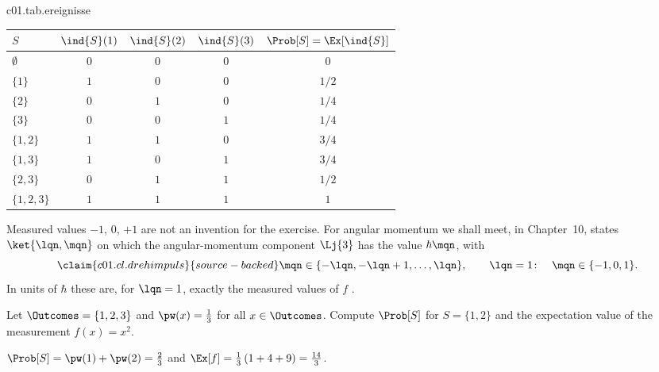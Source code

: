 \begin{tpctable}{c01.tab.ereignisse}
  \caption{All eight events of the experiment of Example~\ref{c01.ex.drei-ergebnisse}, with
    the values of their indicator function at the points $1$, $2$, $3$ and their probability
    for $\pw = (\tfrac12, \tfrac14, \tfrac14)$. Every row is a yes-no measurement and its
    expectation value.}
  \begin{tabular}{lcccc}
    \toprule
    $S$ & $\ind{S}(1)$ & $\ind{S}(2)$ & $\ind{S}(3)$ & $\Prob[S] = \Ex[\ind{S}]$ \\
    \midrule
    $\emptyset$ & $0$ & $0$ & $0$ & $0$ \\
    $\{1\}$ & $1$ & $0$ & $0$ & $1/2$ \\
    $\{2\}$ & $0$ & $1$ & $0$ & $1/4$ \\
    $\{3\}$ & $0$ & $0$ & $1$ & $1/4$ \\
    $\{1, 2\}$ & $1$ & $1$ & $0$ & $3/4$ \\
    $\{1, 3\}$ & $1$ & $0$ & $1$ & $3/4$ \\
    $\{2, 3\}$ & $0$ & $1$ & $1$ & $1/2$ \\
    $\{1, 2, 3\}$ & $1$ & $1$ & $1$ & $1$ \\
    \bottomrule
  \end{tabular}
\end{tpctable}

Measured values $-1$, $0$, $+1$ are not an invention for the exercise. For angular momentum
we shall meet, in Chapter~10, states $\ket{\lqn, \mqn}$ on which the angular-momentum
component $\Lj{3}$ has the value $\hbar \mqn$, with
\begin{equation}\label{c01.eq.drehimpuls}\claim{c01.cl.drehimpuls}{source-backed}
  \mqn \in \{-\lqn, -\lqn + 1, \dots, \lqn\},
  \qquad
  \lqn = 1\colon \quad \mqn \in \{-1, 0, 1\} .
\end{equation}
In units of $\hbar$ these are, for $\lqn = 1$, exactly the measured values of $f$
.

\begin{exercise}\label{c01.exc.drei}
  Let $\Outcomes = \{1, 2, 3\}$ and $\pw(x) = \tfrac13$ for all $x \in \Outcomes$.
  Compute $\Prob[S]$ for $S = \{1, 2\}$ and the expectation value of the measurement
  $f(x) = x^2$.
\end{exercise}
\begin{solution}
  $\Prob[S] = \pw(1) + \pw(2) = \tfrac23$ and
  $\Ex[f] = \tfrac13\,(1 + 4 + 9) = \tfrac{14}{3}$.
\end{solution}

